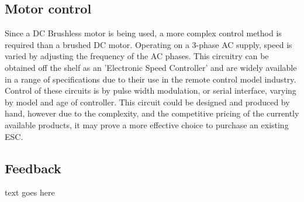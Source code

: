 \documentclass[journal,10pt]{IEEEtran}
\begin{document}
	\subsection{Motor control}
		Since a DC Brushless motor is being used, a more complex control method is required than a brushed DC motor.
		Operating on a 3-phase AC supply, speed is varied by adjusting the frequency of the AC phases.
		This circuitry can be obtained off the shelf as an 'Electronic Speed Controller' and are widely available in a range of specifications due to their use in the remote control model industry.
		Control of these circuits is by pulse width modulation, or serial interface, varying by model and age of controller.
		This circuit could be designed and produced by hand, however due to the complexity, and the competitive pricing of the currently available products, it may prove a more effective choice to purchase an existing ESC.
	\subsection{Feedback}
		text goes here
\end{document}
